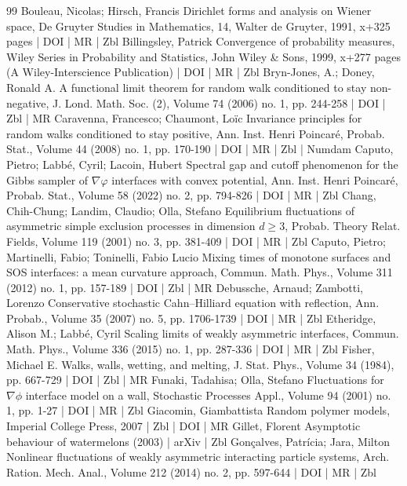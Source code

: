\documentclass[10pt]{amsart}
\theoremstyle{definition}\newtheorem{defi}[theo]{Definition}\newtheorem{rema}[theo]{Remark}\newtheorem{exam}[theo]{Example}\newtheorem{exem}[theo]{Example}\newtheorem{nota}[theo]{Notation}
\theoremstyle{plain}
\begin{document}
\begin{thebibliography}{99}
 Bouleau, Nicolas; Hirsch, Francis Dirichlet forms and analysis on Wiener space, De Gruyter Studies in Mathematics, 14, Walter de Gruyter, 1991, x+325 pages | DOI | MR | Zbl
 Billingsley, Patrick Convergence of probability measures, Wiley Series in Probability and Statistics, John Wiley \& Sons, 1999, x+277 pages (A Wiley-Interscience Publication) | DOI | MR | Zbl
 Bryn-Jones, A.; Doney, Ronald A. A functional limit theorem for random walk conditioned to stay non-negative, J. Lond. Math. Soc. (2), Volume 74 (2006) no. 1, pp. 244-258 | DOI | Zbl | MR
 Caravenna, Francesco; Chaumont, Loïc Invariance principles for random walks conditioned to stay positive, Ann. Inst. Henri Poincaré, Probab. Stat., Volume 44 (2008) no. 1, pp. 170-190 | DOI | MR | Zbl | Numdam
 Caputo, Pietro; Labbé, Cyril; Lacoin, Hubert Spectral gap and cutoff phenomenon for the Gibbs sampler of $\nabla \varphi $ interfaces with convex potential, Ann. Inst. Henri Poincaré, Probab. Stat., Volume 58 (2022) no. 2, pp. 794-826 | DOI | MR | Zbl
 Chang, Chih-Chung; Landim, Claudio; Olla, Stefano Equilibrium fluctuations of asymmetric simple exclusion processes in dimension $d\ge 3$, Probab. Theory Relat. Fields, Volume 119 (2001) no. 3, pp. 381-409 | DOI | MR | Zbl
 Caputo, Pietro; Martinelli, Fabio; Toninelli, Fabio Lucio Mixing times of monotone surfaces and SOS interfaces: a mean curvature approach, Commun. Math. Phys., Volume 311 (2012) no. 1, pp. 157-189 | DOI | Zbl | MR
 Debussche, Arnaud; Zambotti, Lorenzo Conservative stochastic Cahn–Hilliard equation with reflection, Ann. Probab., Volume 35 (2007) no. 5, pp. 1706-1739 | DOI | MR | Zbl
 Etheridge, Alison M.; Labbé, Cyril Scaling limits of weakly asymmetric interfaces, Commun. Math. Phys., Volume 336 (2015) no. 1, pp. 287-336 | DOI | MR | Zbl
 Fisher, Michael E. Walks, walls, wetting, and melting, J. Stat. Phys., Volume 34 (1984), pp. 667-729 | DOI | Zbl | MR
 Funaki, Tadahisa; Olla, Stefano Fluctuations for $\nabla \phi $ interface model on a wall, Stochastic Processes Appl., Volume 94 (2001) no. 1, pp. 1-27 | DOI | MR | Zbl
 Giacomin, Giambattista Random polymer models, Imperial College Press, 2007 | Zbl | DOI | MR
 Gillet, Florent Asymptotic behaviour of watermelons (2003) | arXiv | Zbl
 Gonçalves, Patrícia; Jara, Milton Nonlinear fluctuations of weakly asymmetric interacting particle systems, Arch. Ration. Mech. Anal., Volume 212 (2014) no. 2, pp. 597-644 | DOI | MR | Zbl

\end{thebibliography}
\end{document}
